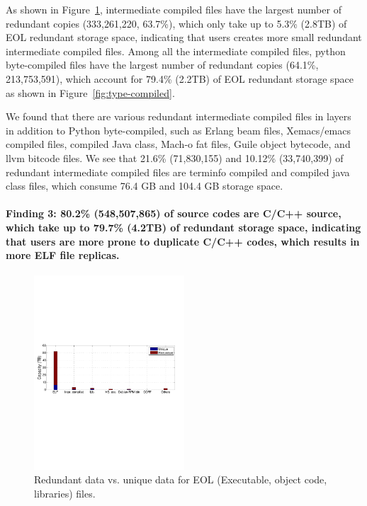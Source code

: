 As shown in Figure~\ref{fig:type-eol}, intermediate compiled files have the largest number of redundant copies (333,261,220, 63.7\%), which only take up to 5.3\% (2.8TB) of EOL redundant storage space, indicating that users creates more small redundant intermediate compiled files. Among all the intermediate compiled files, python byte-compiled files have the largest number of redundant copies (64.1\%, 213,753,591), which account for 79.4\% (2.2TB) of EOL redundant storage space as shown in Figure~\ref{fig:type-compiled}. 

We found that there are various redundant intermediate compiled files in layers in addition to Python byte-compiled, such as Erlang beam files, Xemacs/emacs compiled files, compiled Java class, Mach-o fat files, Guile object bytecode, and llvm bitcode files. We see that 21.6\% (71,830,155) and 10.12\% (33,740,399) of redundant intermediate compiled files are terminfo compiled and compiled java class files, which consume 76.4 GB and 104.4 GB storage space.   


\paragraph{Finding 3: 80.2\% (548,507,865) of source codes are C/C++ source, which take up to 79.7\% (4.2TB) of redundant storage space, indicating that users are more prone to duplicate C/C++ codes, which results in more ELF file replicas.}

\begin{figure}
	\centering
	\includegraphics[width=0.5\textwidth]{graphs/type-exec-cap}
	\caption{Redundant data vs. unique data for EOL (Executable, object code, libraries) files.
	}
	\label{fig:type-eol}
\end{figure}

